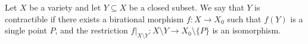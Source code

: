 Let $X$ be a variety and let $Y \subseteq X$ be a closed subset. We say that $Y$ is contractible if there exists a birational morphism $f: X \rightarrow X_0$ such that $f(Y)$ is a single point $P$, and the restriction $f|_{X \setminus Y}: X \setminus Y \rightarrow X_0 \setminus \{P\}$ is an isomorphism.
